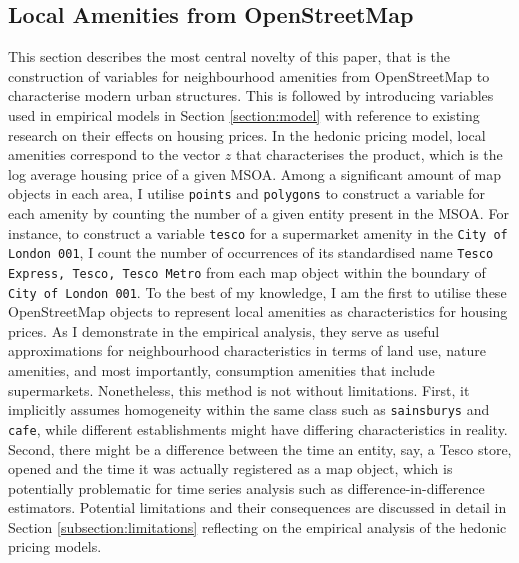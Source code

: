 \documentclass{article}
\begin{document}
\subsection{Local Amenities from OpenStreetMap} \label{subsection:variable}
This section describes the most central novelty of this paper, that is the construction of variables for neighbourhood amenities from OpenStreetMap to characterise modern urban structures. This is followed by introducing variables used in empirical models in Section \ref{section:model} with reference to existing research on their effects on housing prices. In the hedonic pricing model, local amenities correspond to the vector $z$ that characterises the product, which is the log average housing price of a given MSOA. Among a significant amount of map objects in each area, I utilise \texttt{points} and \texttt{polygons} to construct a variable for each amenity by counting the number of a given entity present in the MSOA. For instance, to construct a variable \texttt{tesco} for a supermarket amenity in the \texttt{City of London 001}, I count the number of occurrences of its standardised name \texttt{Tesco Express, Tesco, Tesco Metro} from each map object within the boundary of \texttt{City of London 001}. To the best of my knowledge, I am the first to utilise these OpenStreetMap objects to represent local amenities as characteristics for housing prices. As I demonstrate in the empirical analysis, they serve as useful approximations for neighbourhood characteristics in terms of land use, nature amenities, and most importantly, consumption amenities that include supermarkets. Nonetheless, this method is not without limitations. First, it implicitly assumes homogeneity within the same class such as \texttt{sainsburys} and \texttt{cafe}, while different establishments might have differing characteristics in reality. Second, there might be a difference between the time an entity, say, a Tesco store, opened and the time it was actually registered as a map object, which is potentially problematic for time series analysis such as difference-in-difference estimators. Potential limitations and their consequences are discussed in detail in Section \ref{subsection:limitations} reflecting on the empirical analysis of the hedonic pricing models. 
\end{document}
